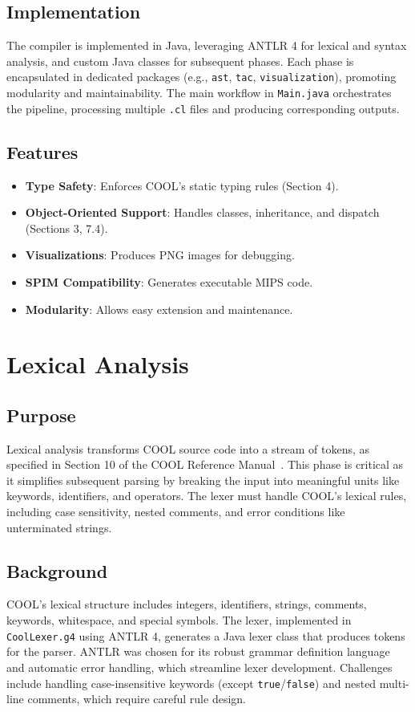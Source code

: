 \documentclass[11pt, titlepage]{article}
\begin{document}
\subsection{Implementation}
The compiler is implemented in Java, leveraging ANTLR 4 for lexical and syntax analysis, and custom Java classes for subsequent phases. Each phase is encapsulated in dedicated packages (e.g., \texttt{ast}, \texttt{tac}, \texttt{visualization}), promoting modularity and maintainability. The main workflow in \texttt{Main.java} orchestrates the pipeline, processing multiple \texttt{.cl} files and producing corresponding outputs.

\subsection{Features}
\begin{itemize}[leftmargin=*]
    \item \textbf{Type Safety}: Enforces COOL's static typing rules (Section 4).
    \item \textbf{Object-Oriented Support}: Handles classes, inheritance, and dispatch (Sections 3, 7.4).
    \item \textbf{Visualizations}: Produces PNG images for debugging.
    \item \textbf{SPIM Compatibility}: Generates executable MIPS code.
    \item \textbf{Modularity}: Allows easy extension and maintenance.
\end{itemize}

\section{Lexical Analysis}
\label{sec:lexical}

\subsection{Purpose}
Lexical analysis transforms COOL source code into a stream of tokens, as specified in Section 10 of the COOL Reference Manual~\cite{cool_manual}. This phase is critical as it simplifies subsequent parsing by breaking the input into meaningful units like keywords, identifiers, and operators. The lexer must handle COOL's lexical rules, including case sensitivity, nested comments, and error conditions like unterminated strings.

\subsection{Background}
COOL's lexical structure includes integers, identifiers, strings, comments, keywords, whitespace, and special symbols. The lexer, implemented in \texttt{CoolLexer.g4} using ANTLR 4, generates a Java lexer class that produces tokens for the parser. ANTLR was chosen for its robust grammar definition language and automatic error handling, which streamline lexer development. Challenges include handling case-insensitive keywords (except \texttt{true}/\texttt{false}) and nested multi-line comments, which require careful rule design.
\end{document}
